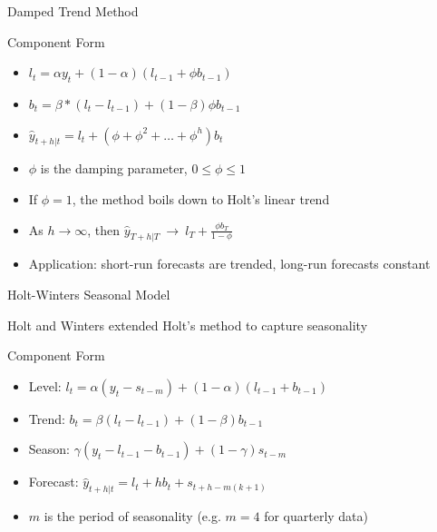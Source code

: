 \documentclass{beamer}
\begin{document}



\begin{frame}{Damped Trend Method}

  \begin{block}{Component Form}
    \begin{itemize}
    \item $l_t = \alpha y_t + (1-\alpha)(l_{t-1} + \phi b_{t-1})$
    \item $b_t = \beta*(l_t - l_{t-1}) + (1-\beta)\phi b_{t-1}$
    \item $\hat{y}_{t+h|t} = l_t + (\phi + \phi^2 + \dots + \phi^h)b_t$
    \end{itemize}
  \end{block}

  \begin{itemize}
  \item $\phi$ is the damping parameter, $0 \leq \phi \leq 1$
  \item If $\phi=1$, the method boils down to Holt's linear trend
  \item As $h \to \infty$, then $\hat{y}_{T+h|T} \ \to \ l_T + \frac{\phi b_T}{1-\phi}$
  \item Application: short-run forecasts are trended, long-run forecasts constant
  \end{itemize}
  
  
\end{frame}


\begin{frame}{Holt-Winters Seasonal Model}

  Holt and Winters extended Holt's method to capture seasonality
  
  \begin{block}{Component Form}
    \begin{itemize}
    \item Level: $l_t = \alpha (y_t - s_{t-m}) + (1- \alpha )(l_{t-1} + b_{t-1})$
    \item Trend: $b_t = \beta(l_t - l_{t-1}) + (1-\beta)b_{t-1}$
    \item Season: $\gamma(y_t - l_{t-1} - b_{t-1}) + (1-\gamma)s_{t-m}$
    \item Forecast: $\hat{y}_{t+h|t} = l_t + hb_t + s_{t+h - m(k+1)}$
    \end{itemize}
  \end{block}

  \begin{itemize}
  \item $m$ is the period of seasonality (e.g. $m = 4$ for quarterly data)
  \end{itemize}
  
\end{frame}
\end{document}
